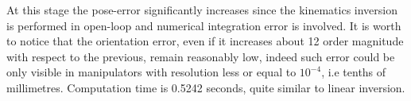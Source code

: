 At this stage the pose-error significantly increases since the kinematics inversion is performed in open-loop and numerical integration error is involved. It is worth to notice that the orientation error, even if it increases about 12 order magnitude with respect to the previous, remain reasonably low, indeed such error could be only visible in manipulators with resolution less or equal to $10^{-4}$, i.e tenths of millimetres. Computation time is 0.5242 seconds, quite similar to linear inversion.
\begin{figure}
	\label{fig:dikerr}
	\centering
	\hspace{1cm}

\end{figure}
